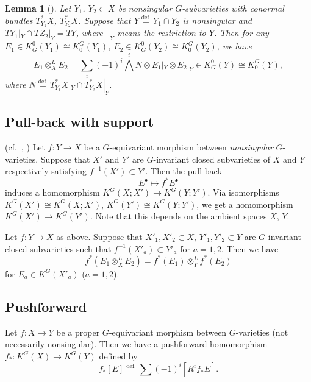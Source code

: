 \documentclass[12pt]{amsart}
\newtheorem{Lemma}[equation]{Lemma}
\theoremstyle{definition}
\theoremstyle{remark}
\numberwithin{equation}{subsection}
\newcommand{\defeq}{\overset{\operatorname{\scriptstyle def.}}{=}}
\newcommand{\Wedge}{{\textstyle \bigwedge}}
\begin{document}
\begin{Lemma}[]\label{lem:cleanint}
Let $Y_1$, $Y_2\subset X$ be nonsingular $G$-subvarieties with conormal
bundles $T_{Y_1}^* X$, $T_{Y_2}^* X$.
Suppose that $Y \defeq Y_1\cap Y_2$ is nonsingular and
$TY_1|_Y \cap TZ_2|_Y = TY$, where $\ |_Y$ means the restriction to
$Y$.
%
Then for any $E_1\in K_G^0(Y_1)\cong K^G_0(Y_1)$, 
$E_2\in K_G^0(Y_2)\cong K^G_0(Y_2)$, we have
\begin{equation*}
  E_1 \otimes^L_X E_2
 = \sum_i (-1)^i \Wedge^i N \otimes E_1|_Y\otimes E_2|_Y 
 \in K_G^0(Y)\cong K^G_0(Y),
\end{equation*}
where $N \defeq T_{Y_1}^*X|_Y\cap T_{Y_2}^*X|_Y$.
\end{Lemma}

\subsection{Pull-back with support}\label{subsec:pullback}
(cf.\ \cite[1.2]{BFM}, \cite[5.2.5]{Gi-book})
%
Let $f\colon Y\to X$ be a $G$-equivariant morphism between {\it
nonsingular\/} $G$-varieties. Suppose that $X'$ and $Y'$ are
$G$-invariant closed subvarieties of $X$ and $Y$ respectively
satisfying $f^{-1}(X')\subset Y'$. Then the pull-back
\begin{equation*}
   E^\bullet \mapsto f^* E^\bullet
\end{equation*}
induces a homomorphism $K^G(X;X') \to K^G(Y;Y')$. Via isomorphisms
$K^G(X')\cong K^G(X;X')$, $K^G(Y')\cong K^G(Y;Y')$, we get
a homomorphism $K^G(X')\to K^G(Y')$. Note that this depends on the
ambient spaces $X$, $Y$.

Let $f\colon Y\to X$ as above.
%
Suppose that $X'_1, X'_2\subset X$, $Y'_1, Y'_2\subset Y$ are
$G$-invariant closed subvarieties such that $f^{-1}(X'_a) \subset Y'_a$
for $a=1,2$.
%
Then we have
\begin{equation}\label{eq:pull_product}
   f^*(E_1\otimes^L_X E_2) = f^*(E_1)\otimes^L_Y f^*(E_2)
\end{equation}
for $E_a\in K^G(X'_a)$ ($a=1,2$).

\subsection{Pushforward}\label{subsec:push}

Let $f\colon X\to Y$ be a proper $G$-equivariant morphism between
$G$-varieties (not necessarily nonsingular). Then we have a
pushforward homomorphism $f_*\colon K^G(X)\to K^G(Y)$ defined by
\begin{equation*}
   f_*[E] \defeq \sum (-1)^i [R^i f_* E].
\end{equation*}
\end{document}
